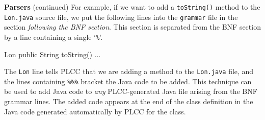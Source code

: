 \begin{minipage}[t]{\sw}
\slidenumber
\LARGE
{\bf Parsers} (continued)\exx
\emm\LightBox{\MYlonGrammarKleene}\exx
For example, if we want to add a \verb'toString()' method
to the \verb'Lon.java' source file, we put the following lines
into the \verb'grammar' file in the section {\em following the BNF section}.
This section is separated from the BNF section
by a line containing a single `\verb'%''.
\begin{qv}
Lon
    public String toString() {
        ...
    }
\end{qv}
The \verb'Lon' line tells PLCC that we are adding a method
to the \verb'Lon.java' file,
and the lines containing \verb'%%%'
bracket the Java code to be added.
This technique can be used to add Java code
to {\em any} PLCC-generated Java file arising from the BNF grammar lines.
The added code appears at the end of the class definition
in the Java code generated automatically by PLCC for the class.\exx
\end{minipage}
\clearpage
